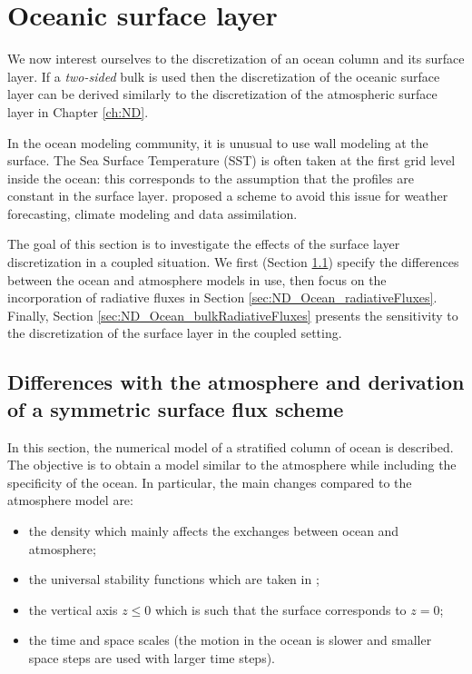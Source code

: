 \section{Oceanic surface layer}
\label{sec:OceanND_OSL}
We now interest ourselves to the discretization of an ocean
column and its surface layer.
If a \textit{two-sided} bulk is used then the
discretization of the oceanic surface layer can be derived
similarly to the discretization of the atmospheric surface
layer in Chapter \ref{ch:ND}.
\par
In the ocean modeling community, it is unusual to use
wall modeling at the surface. The Sea Surface Temperature
(SST) is often taken at the first grid level inside the
ocean: this corresponds to the assumption that 
the profiles are constant in the surface layer.
\cite{zeng_prognostic_2005} proposed a scheme to avoid this
issue for weather forecasting, climate modeling and
data assimilation.
%
\par
The goal of this section is to investigate the effects
of the surface layer discretization in a coupled situation.
We first (Section \ref{sec:ND_Ocean_differencesWithAtmosphere})
specify the differences between the ocean and
atmosphere models in use,
then focus on the incorporation of radiative fluxes in
Section \ref{sec:ND_Ocean_radiativeFluxes}.
Finally, Section \ref{sec:ND_Ocean_bulkRadiativeFluxes}
presents the sensitivity to the discretization of the
surface layer in the coupled setting.
\subsection{Differences with the atmosphere and derivation of
	a symmetric surface flux scheme}
\label{sec:ND_Ocean_differencesWithAtmosphere}
In this section, the numerical model of a stratified column
of ocean is described. The objective is to obtain a model
similar to the atmosphere while including the specificity
of the ocean.
In particular, the main changes compared to the atmosphere
model are:
\begin{itemize}
	\item the density which mainly affects the exchanges
		between ocean and atmosphere;
	\item the universal stability functions which are
		taken in \cite{large_similarity_2019};
	\item the vertical axis $z \leq 0$
		which is such that the surface corresponds to $z=0$;
	\item the time and space scales (the motion in the ocean
		is slower and smaller space steps are used with
		larger time steps).
\end{itemize}
